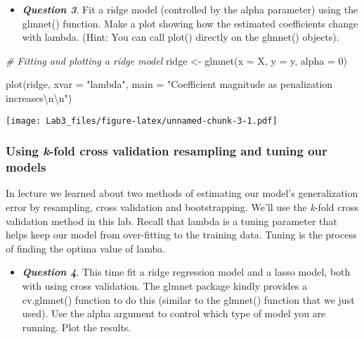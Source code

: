 \documentclass[
]{article}
\newenvironment{Shaded}{\begin{snugshade}}{\end{snugshade}}
\newcommand{\AttributeTok}[1]{\textcolor[rgb]{0.77,0.63,0.00}{#1}}
\newcommand{\CommentTok}[1]{\textcolor[rgb]{0.56,0.35,0.01}{\textit{#1}}}
\newcommand{\DecValTok}[1]{\textcolor[rgb]{0.00,0.00,0.81}{#1}}
\newcommand{\FunctionTok}[1]{\textcolor[rgb]{0.00,0.00,0.00}{#1}}
\newcommand{\NormalTok}[1]{#1}
\newcommand{\OtherTok}[1]{\textcolor[rgb]{0.56,0.35,0.01}{#1}}
\newcommand{\SpecialCharTok}[1]{\textcolor[rgb]{0.00,0.00,0.00}{#1}}
\newcommand{\StringTok}[1]{\textcolor[rgb]{0.31,0.60,0.02}{#1}}
\providecommand{\tightlist}{%
  \setlength{\itemsep}{0pt}\setlength{\parskip}{0pt}}
\begin{document}
\begin{itemize}
\tightlist
\item
  \textbf{\emph{Question 3}}. Fit a ridge model (controlled by the alpha
  parameter) using the glmnet() function. Make a plot showing how the
  estimated coefficients change with lambda. (Hint: You can call plot()
  directly on the glmnet() objects).
\end{itemize}

\begin{Shaded}
\begin{Highlighting}[]
\CommentTok{\# Fitting and plotting a ridge model}
\NormalTok{ridge }\OtherTok{\textless{}{-}} \FunctionTok{glmnet}\NormalTok{(}\AttributeTok{x =}\NormalTok{ X, }\AttributeTok{y =}\NormalTok{ y, }\AttributeTok{alpha =} \DecValTok{0}\NormalTok{)}

\FunctionTok{plot}\NormalTok{(ridge, }\AttributeTok{xvar =} \StringTok{"lambda"}\NormalTok{, }\AttributeTok{main =} \StringTok{"Coefficient magnitude as penalization increases}\SpecialCharTok{\textbackslash{}n\textbackslash{}n}\StringTok{"}\NormalTok{)}
\end{Highlighting}
\end{Shaded}

\texttt{[image: Lab3\_files/figure-latex/unnamed-chunk-3-1.pdf]}

\hypertarget{using-k-fold-cross-validation-resampling-and-tuning-our-models}{%
\subsubsection{\texorpdfstring{Using \emph{k}-fold cross validation
resampling and tuning our
models}{Using k-fold cross validation resampling and tuning our models}}\label{using-k-fold-cross-validation-resampling-and-tuning-our-models}}

In lecture we learned about two methods of estimating our model's
generalization error by resampling, cross validation and bootstrapping.
We'll use the \emph{k}-fold cross validation method in this lab. Recall
that lambda is a tuning parameter that helps keep our model from
over-fitting to the training data. Tuning is the process of finding the
optima value of lamba.

\begin{itemize}
\tightlist
\item
  \textbf{\emph{Question 4}}. This time fit a ridge regression model and
  a lasso model, both with using cross validation. The glmnet package
  kindly provides a cv.glmnet() function to do this (similar to the
  glmnet() function that we just used). Use the alpha argument to
  control which type of model you are running. Plot the results.
\end{itemize}
\end{document}
